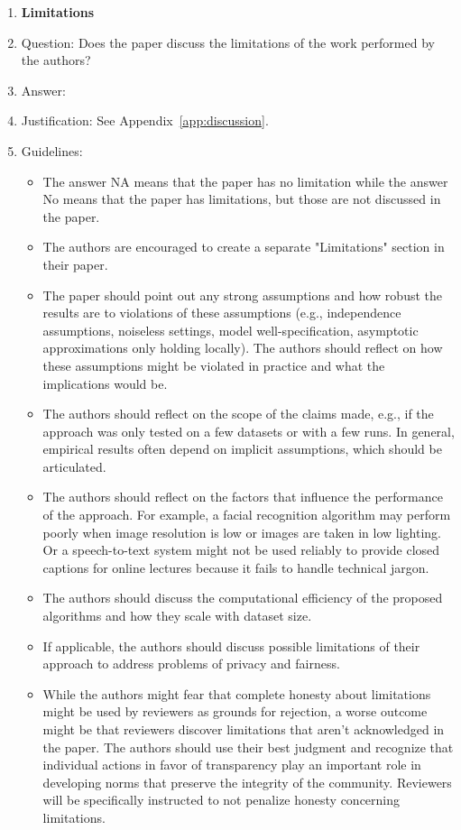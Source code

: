 \documentclass{article}
\theoremstyle{plain}
\theoremstyle{definition}
\theoremstyle{remark}
\begin{document}
\begin{enumerate}
\item {\bf Limitations}
    \item[] Question: Does the paper discuss the limitations of the work performed by the authors?
    \item[] Answer: \answerYes{}%
    \item[] Justification: See Appendix~\ref{app:discussion}.    \item[] Guidelines:
    \begin{itemize}
        \item The answer NA means that the paper has no limitation while the answer No means that the paper has limitations, but those are not discussed in the paper. 
        \item The authors are encouraged to create a separate "Limitations" section in their paper.
        \item The paper should point out any strong assumptions and how robust the results are to violations of these assumptions (e.g., independence assumptions, noiseless settings, model well-specification, asymptotic approximations only holding locally). The authors should reflect on how these assumptions might be violated in practice and what the implications would be.
        \item The authors should reflect on the scope of the claims made, e.g., if the approach was only tested on a few datasets or with a few runs. In general, empirical results often depend on implicit assumptions, which should be articulated.
        \item The authors should reflect on the factors that influence the performance of the approach. For example, a facial recognition algorithm may perform poorly when image resolution is low or images are taken in low lighting. Or a speech-to-text system might not be used reliably to provide closed captions for online lectures because it fails to handle technical jargon.
        \item The authors should discuss the computational efficiency of the proposed algorithms and how they scale with dataset size.
        \item If applicable, the authors should discuss possible limitations of their approach to address problems of privacy and fairness.
        \item While the authors might fear that complete honesty about limitations might be used by reviewers as grounds for rejection, a worse outcome might be that reviewers discover limitations that aren't acknowledged in the paper. The authors should use their best judgment and recognize that individual actions in favor of transparency play an important role in developing norms that preserve the integrity of the community. Reviewers will be specifically instructed to not penalize honesty concerning limitations.
    \end{itemize}


\end{enumerate}
\end{document}
